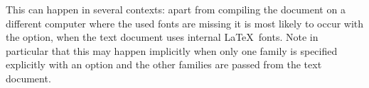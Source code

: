 \bigskip
{}

This can happen in several contexts: apart from compiling the document on a
different computer where the used fonts are missing it is most likely to occur
with the  option, when the text document uses internal
\LaTeX\ fonts. Note in particular that this may happen implicitly when only one
family is specified explicitly with an option and the other families are passed
from the text document.
